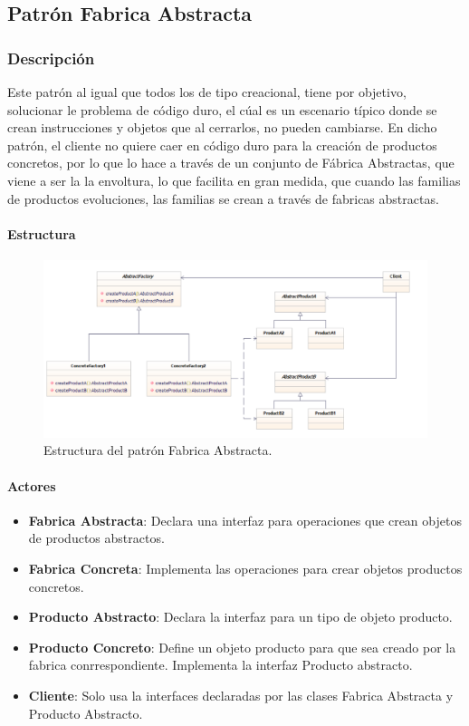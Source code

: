 \subsection{Patrón Fabrica Abstracta}
\subsubsection{Descripción}
Este patrón al igual que todos los de tipo creacional, tiene por objetivo, solucionar le problema de código duro, el cúal es un escenario típico donde se crean instrucciones y objetos que al cerrarlos, no pueden cambiarse.
En dicho patrón, el cliente no quiere caer en código duro para la creación de productos concretos, por lo que lo hace a través de un conjunto de Fábrica Abstractas, que viene a ser la la envoltura, lo que facilita en gran medida, que cuando las familias de productos evoluciones, las familias se crean a través de fabricas abstractas.

\paragraph{Estructura}

\begin{figure}[th!]
	\centering
	\includegraphics[width=.7\linewidth]{imagenes/Patrones/Fabrica.pdf}
	\caption{Estructura del patrón Fabrica Abstracta.\cite{gof}}	
\end{figure}

\paragraph{Actores}

\begin{itemize}
	\item \textbf{Fabrica Abstracta}: Declara una interfaz para operaciones que crean objetos de productos abstractos.
	\item \textbf{Fabrica Concreta}: Implementa las operaciones para crear objetos productos concretos.
	\item \textbf{Producto Abstracto}: Declara la interfaz para un tipo de objeto producto.
	\item \textbf{Producto Concreto}: Define un objeto producto para que sea creado por la fabrica conrrespondiente. Implementa la interfaz Producto abstracto.
	\item \textbf{Cliente}: Solo usa la interfaces declaradas por las clases Fabrica Abstracta y Producto Abstracto.
	
\end{itemize}


